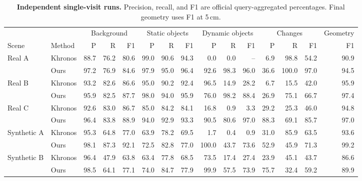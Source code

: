 \begin{table}[t]
\centering
\fontsize{9}{10.3}\selectfont
\setlength{\tabcolsep}{2.3pt}
\renewcommand{\arraystretch}{1.08}
\begin{tabular}{@{}ll*{13}{r}@{}}
\toprule
& & \multicolumn{3}{c}{Background} & \multicolumn{3}{c}{Static objects} & \multicolumn{3}{c}{Dynamic objects} & \multicolumn{3}{c}{Changes} & Geometry \\
\cmidrule(lr){3-5}\cmidrule(lr){6-8}\cmidrule(lr){9-11}\cmidrule(lr){12-14}
Scene & Method & P & R & F1 & P & R & F1 & P & R & F1 & P & R & F1 & F1 \\ \midrule
Real A & Khronos & 88.7 & 76.2 & 80.6 & 99.0 & 90.6 & 94.3 & 0.0 & 0.0 & -- & 6.9 & 98.8 & 54.2 & 90.9 \\
 & Ours & 97.2 & 76.9 & 84.6 & 97.9 & 95.0 & 96.4 & 92.6 & 98.3 & 96.0 & 36.6 & 100.0 & 97.0 & 94.5 \\
\midrule
Real B & Khronos & 93.2 & 82.6 & 86.6 & 95.0 & 90.2 & 92.4 & 96.5 & 14.9 & 28.2 & 6.7 & 15.5 & 42.0 & 95.9 \\
 & Ours & 95.9 & 82.5 & 87.7 & 98.0 & 94.0 & 95.9 & 76.0 & 98.2 & 88.4 & 26.9 & 75.1 & 66.7 & 97.4 \\
\midrule
Real C & Khronos & 92.6 & 83.0 & 86.7 & 85.0 & 84.2 & 84.1 & 16.8 & 0.9 & 3.3 & 29.2 & 25.3 & 46.0 & 94.8 \\
 & Ours & 96.4 & 83.8 & 88.9 & 94.0 & 92.9 & 93.3 & 90.5 & 80.6 & 97.0 & 88.3 & 69.1 & 85.7 & 97.0 \\
\midrule
Synthetic A & Khronos & 95.3 & 64.8 & 77.0 & 63.9 & 78.2 & 69.5 & 1.7 & 0.4 & 0.9 & 31.0 & 85.9 & 63.5 & 93.6 \\
 & Ours & 98.1 & 87.3 & 92.1 & 72.5 & 82.8 & 77.0 & 100.0 & 43.7 & 73.6 & 52.9 & 45.9 & 71.3 & 99.2 \\
\midrule
Synthetic B & Khronos & 96.4 & 47.9 & 63.8 & 63.4 & 77.8 & 68.5 & 73.5 & 17.4 & 27.4 & 23.9 & 45.1 & 43.7 & 86.6 \\
 & Ours & 98.5 & 64.1 & 77.1 & 74.0 & 84.7 & 77.9 & 99.9 & 57.5 & 73.9 & 75.7 & 32.4 & 59.2 & 89.9 \\
\bottomrule
\end{tabular}
\caption{\textbf{Independent single-visit runs.} Precision, recall, and F1 are official query-aggregated percentages. Final geometry uses F1 at 5\,cm.}
\label{tab:supp_single}
\end{table}
